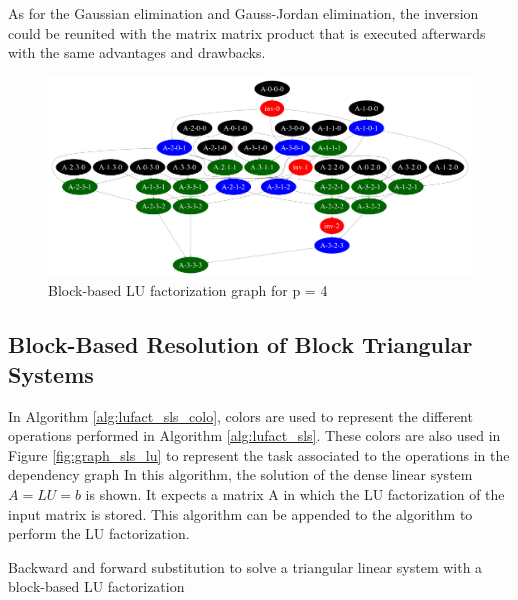 As for the Gaussian elimination and Gauss-Jordan elimination, the inversion could be reunited with the matrix matrix product that is executed afterwards with the same advantages and drawbacks.

\begin{figure}[h]
	\centering
	\includegraphics[width=\textwidth]{lu_graph_n4}
	\caption{Block-based LU factorization graph for p = 4\label{fig:graph_lu}}
\end{figure}

\subsection{Block-Based Resolution of Block Triangular Systems}

In Algorithm \ref{alg:lufact_sls_colo}, colors are used to represent the different operations performed in Algorithm \ref{alg:lufact_sls}.
These colors are also used in Figure \ref{fig:graph_sls_lu} to represent the task associated to the operations in the dependency graph
In this algorithm, the solution of the dense linear system $A = LU = b$ is shown.
It expects a matrix A in which the LU factorization of the input matrix is stored.
This algorithm can be appended to the algorithm to perform the LU factorization.

\begin{algorithm}[h]
	\DontPrintSemicolon
	\caption{Backward and forward substitution to solve a triangular linear system with a block-based LU factorization\label{alg:lufact_sls_colo}}
	\;
\end{algorithm}

